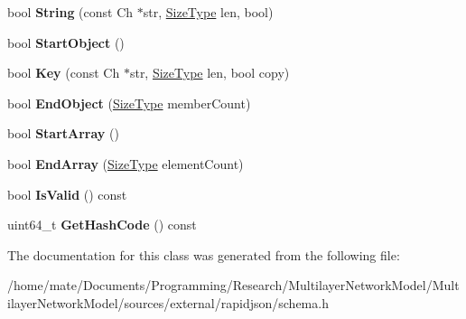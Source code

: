 \begin{DoxyCompactItemize}
\item 
bool {\bfseries String} (const Ch $\ast$str, \hyperlink{rapidjson_8h_a5ed6e6e67250fadbd041127e6386dcb5}{Size\+Type} len, bool)\hypertarget{classinternal_1_1Hasher_a885f2bf42f2bb64d6f9443129dce3883}{}\label{classinternal_1_1Hasher_a885f2bf42f2bb64d6f9443129dce3883}

\item 
bool {\bfseries Start\+Object} ()\hypertarget{classinternal_1_1Hasher_a1607d6cac3daab9725e442e38d121028}{}\label{classinternal_1_1Hasher_a1607d6cac3daab9725e442e38d121028}

\item 
bool {\bfseries Key} (const Ch $\ast$str, \hyperlink{rapidjson_8h_a5ed6e6e67250fadbd041127e6386dcb5}{Size\+Type} len, bool copy)\hypertarget{classinternal_1_1Hasher_a1b34d88f85f9c6a739c1f9038f14f078}{}\label{classinternal_1_1Hasher_a1b34d88f85f9c6a739c1f9038f14f078}

\item 
bool {\bfseries End\+Object} (\hyperlink{rapidjson_8h_a5ed6e6e67250fadbd041127e6386dcb5}{Size\+Type} member\+Count)\hypertarget{classinternal_1_1Hasher_a7050f1552d88967944195163a6a0b08e}{}\label{classinternal_1_1Hasher_a7050f1552d88967944195163a6a0b08e}

\item 
bool {\bfseries Start\+Array} ()\hypertarget{classinternal_1_1Hasher_a2ceb3cc00216f6b6ce66907856a16404}{}\label{classinternal_1_1Hasher_a2ceb3cc00216f6b6ce66907856a16404}

\item 
bool {\bfseries End\+Array} (\hyperlink{rapidjson_8h_a5ed6e6e67250fadbd041127e6386dcb5}{Size\+Type} element\+Count)\hypertarget{classinternal_1_1Hasher_ad445b2730be23e18b4dec2c4d1033419}{}\label{classinternal_1_1Hasher_ad445b2730be23e18b4dec2c4d1033419}

\item 
bool {\bfseries Is\+Valid} () const \hypertarget{classinternal_1_1Hasher_abd4cb8325b81217dc34eecf63d47579f}{}\label{classinternal_1_1Hasher_abd4cb8325b81217dc34eecf63d47579f}

\item 
uint64\+\_\+t {\bfseries Get\+Hash\+Code} () const \hypertarget{classinternal_1_1Hasher_ad44fcaf9a12fefb387e9624327572b61}{}\label{classinternal_1_1Hasher_ad44fcaf9a12fefb387e9624327572b61}

\end{DoxyCompactItemize}


The documentation for this class was generated from the following file\+:\begin{DoxyCompactItemize}
\item 
/home/mate/\+Documents/\+Programming/\+Research/\+Multilayer\+Network\+Model/\+Multilayer\+Network\+Model/sources/external/rapidjson/schema.\+h\end{DoxyCompactItemize}
